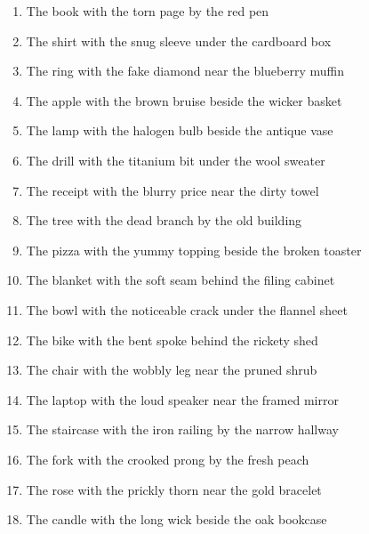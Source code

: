 \documentclass[12pt,titlepage]{article}
\begin{document}
\begin{enumerate}

\item The book with the torn page by the red pen
    
\item The shirt with the snug sleeve under the cardboard box
    
\item The ring with the fake diamond near the blueberry muffin
    
\item The apple with the brown bruise beside the wicker basket
    
\item The lamp with the halogen bulb beside the antique vase
    
\item The drill with the titanium bit under the wool sweater 
    
\item The receipt with the blurry price near the dirty towel
    
\item The tree with the dead branch by the old building
    
\item The pizza with the yummy topping beside the broken toaster
    
\item The blanket with the soft seam behind the filing cabinet
    
\item The bowl with the noticeable crack under the flannel sheet
    
\item The bike with the bent spoke behind the rickety shed
    
\item The chair with the wobbly leg near the pruned shrub
    
\item The laptop with the loud speaker near the framed mirror
    
\item The staircase with the iron railing by the narrow hallway
    
\item The fork with the crooked prong by the fresh peach
    
\item The rose with the prickly thorn near the gold bracelet
    
\item The candle with the long wick beside the oak bookcase
    

\end{enumerate}
\end{document}
